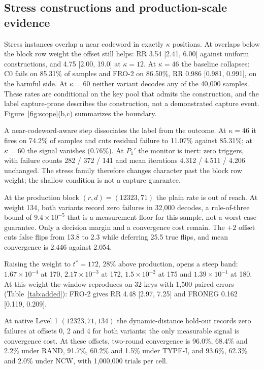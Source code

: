 \subsection{Stress constructions and production-scale evidence}\label{sec:boundary}

Stress instances overlap a near codeword in exactly $\kappa$ positions. At overlaps below the block row weight the offset still helps: RR 3.54 [2.41, 6.00] against uniform constructions, and 4.75 [2.00, 19.0] at $\kappa=12$. At $\kappa=46$ the baseline collapses: C0 fails on 85.31\% of samples and FRO-2 on 86.50\%, RR 0.986 [0.981, 0.991], on the harmful side. At $\kappa=60$ neither variant decodes any of the 40{,}000 samples. These rates are conditional on the key pool that admits the construction, and the label capture-prone describes the construction, not a demonstrated capture event. Figure~\ref{fig:scope}(b,c) summarizes the boundary.

A near-codeword-aware step dissociates the label from the outcome. At $\kappa=46$ it fires on 74.2\% of samples and cuts residual failure to 11.07\% against 85.31\%; at $\kappa=60$ the signal vanishes (0.76\%). At $P_1'$ the monitor is inert: zero triggers, with failure counts 282 / 372 / 141 and mean iterations 4.312 / 4.511 / 4.206 unchanged. The stress family therefore changes character past the block row weight; the shallow condition is not a capture guarantee.

At the production block $(r,d)=(12323,71)$ the plain rate is out of reach. At weight 134, both variants record zero failures in 32{,}000 decodes, a rule-of-three bound of $9.4\times10^{-5}$ that is a measurement floor for this sample, not a worst-case guarantee. Only a decision margin and a convergence cost remain. The $+2$ offset cuts false flips from 13.8 to 2.3 while deferring 25.5 true flips, and mean convergence is 2.446 against 2.054.\label{sec:production}

Raising the weight to $t^\ast=172$, 28\% above production, opens a steep band: $1.67\times10^{-4}$ at 170, $2.17\times10^{-3}$ at 172, $1.5\times10^{-2}$ at 175 and $1.39\times10^{-1}$ at 180. At this weight the window reproduces on 32 keys with 1{,}500 paired errors (Table~\ref{tab:added}): FRO-2 gives RR 4.48 [2.97, 7.25] and FRONEG 0.162 [0.119, 0.209].

At native Level 1 $(12323,71,134)$ the dynamic-distance hold-out records zero failures at offsets 0, 2 and 4 for both variants; the only measurable signal is convergence cost. At these offsets, two-round convergence is 96.0\%, 68.4\% and 2.2\% under RAND, 91.7\%, 60.2\% and 1.5\% under TYPE-I, and 93.6\%, 62.3\% and 2.0\% under NCW, with 1{,}000{,}000 trials per cell.

